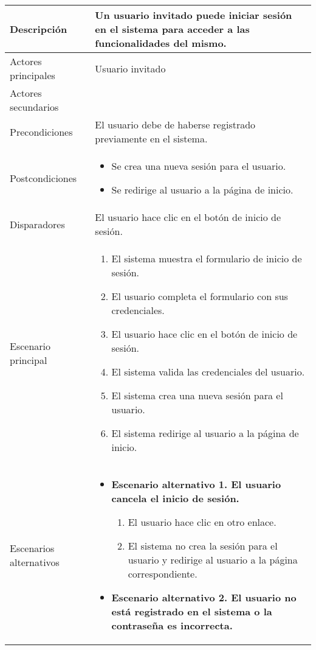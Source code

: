 \begin{longtable}{
    >{\columncolor{lightgreen!20}}p{4cm}
    p{12cm}
    }
    \midrule
    Descripción & Un usuario invitado puede iniciar sesión en el sistema para acceder a las funcionalidades del mismo. \\
    \midrule
    Actores principales & Usuario invitado \\
    \midrule
    Actores secundarios &  \\
    \midrule
    Precondiciones & El usuario debe de haberse registrado previamente en el sistema. \\
    \midrule
    Postcondiciones & \begin{itemize}[nosep,leftmargin=*]
        \item Se crea una nueva sesión para el usuario.
        \item Se redirige al usuario a la página de inicio.
    \end{itemize} \\
    \midrule
    Disparadores & El usuario hace clic en el botón de inicio de sesión. \\
    \midrule
    Escenario principal & \begin{enumerate}[nosep,leftmargin=*]
        \item El sistema muestra el formulario de inicio de sesión.
        \item El usuario completa el formulario con sus credenciales.
        \item El usuario hace clic en el botón de inicio de sesión.
        \item El sistema valida las credenciales del usuario.
        \item El sistema crea una nueva sesión para el usuario.
        \item El sistema redirige al usuario a la página de inicio.
    \end{enumerate} \\
    \midrule
    Escenarios alternativos & 
    \begin{itemize}[nosep,leftmargin=*]
      \item \textbf{Escenario alternativo 1. El usuario cancela el inicio de sesión.}
      \begin{enumerate}[nosep,leftmargin=*]
          \item El usuario hace clic en otro enlace.
          \item El sistema no crea la sesión para el usuario y redirige al usuario a la página correspondiente.
      \end{enumerate}
      \item \textbf{Escenario alternativo 2. El usuario no está registrado en el sistema o la contraseña es incorrecta.}

\end{itemize}
\end{longtable}
